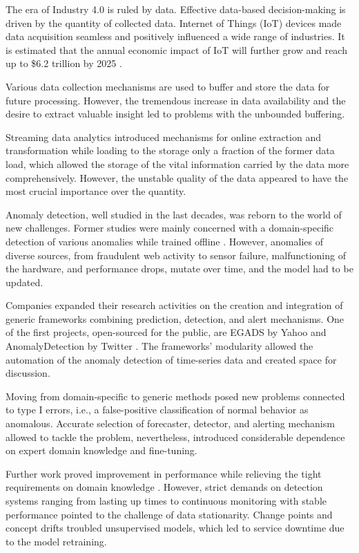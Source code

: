 The era of Industry 4.0 is ruled by data. Effective data-based decision-making is driven by the quantity of collected data. Internet of Things (IoT) devices made data acquisition seamless and positively influenced a wide range of industries. It is estimated that the annual economic impact of IoT will further grow and reach up to \$6.2 trillion by 2025 \cite{Manyika2013}. 

Various data collection mechanisms are used to buffer and store the data for future processing. However, the tremendous increase in data availability and the desire to extract valuable insight led to problems with the unbounded buffering.

Streaming data analytics introduced mechanisms for online extraction and transformation while loading to the storage only a fraction of the former data load, which allowed the storage of the vital information carried by the data more comprehensively. However, the unstable quality of the data appeared to have the most crucial importance over the quantity. 

Anomaly detection, well studied in the last decades, was reborn to the world of new challenges. Former studies were mainly concerned with a domain-specific detection of various anomalies while trained offline \cite{Chandola2009}. However, anomalies of diverse sources, from fraudulent web activity to sensor failure, malfunctioning of the hardware, and performance drops, mutate over time, and the model had to be updated.

Companies expanded their research activities on the creation and integration of generic frameworks combining prediction, detection, and alert mechanisms. One of the first projects, open-sourced for the public, are EGADS by Yahoo \cite{Laptev2015} and AnomalyDetection by Twitter \cite{Kejariwal2015}. The frameworks' modularity allowed the automation of the anomaly detection of time-series data and created space for discussion. 

Moving from domain-specific to generic methods posed new problems connected to type I errors, i.e., a false-positive classification of normal behavior as anomalous. Accurate selection of forecaster, detector, and alerting mechanism allowed to tackle the problem, nevertheless, introduced considerable dependence on expert domain knowledge and fine-tuning. 

Further work proved improvement in performance while relieving the tight requirements on domain knowledge \cite{Ahmad2016}. However, strict demands on detection systems ranging from lasting up times to continuous monitoring with stable performance pointed to the challenge of data stationarity. Change points and concept drifts troubled unsupervised models, which led to service downtime due to the model retraining.  

